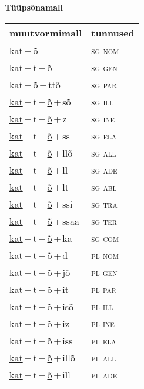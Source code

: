 
\vspace{1.8em}
\begin{minipage}{\textwidth}
\textbf{Tüüpsõnamall \,}\\

\begin{sideways}
\begin{tabular}{l l}
muutvormimall & tunnused \\
\hline
\underline{kat}\,+\,\underline{õ} & \textsc{ sg nom } \\
\underline{kat}\,+\,t\,+\,\underline{õ} & \textsc{ sg gen } \\
\underline{kat}\,+\,\underline{õ}\,+\,ttõ & \textsc{ sg par } \\
\underline{kat}\,+\,t\,+\,\underline{õ}\,+\,sõ & \textsc{ sg ill } \\
\underline{kat}\,+\,t\,+\,\underline{õ}\,+\,z & \textsc{ sg ine } \\
\underline{kat}\,+\,t\,+\,\underline{õ}\,+\,ss & \textsc{ sg ela } \\
\underline{kat}\,+\,t\,+\,\underline{õ}\,+\,llõ & \textsc{ sg all } \\
\underline{kat}\,+\,t\,+\,\underline{õ}\,+\,ll & \textsc{ sg ade } \\
\underline{kat}\,+\,t\,+\,\underline{õ}\,+\,lt & \textsc{ sg abl } \\
\underline{kat}\,+\,t\,+\,\underline{õ}\,+\,ssi & \textsc{ sg tra } \\
\underline{kat}\,+\,t\,+\,\underline{õ}\,+\,ssaa & \textsc{ sg ter } \\
\underline{kat}\,+\,t\,+\,\underline{õ}\,+\,ka & \textsc{ sg com } \\
\underline{kat}\,+\,t\,+\,\underline{õ}\,+\,d & \textsc{ pl nom } \\
\underline{kat}\,+\,t\,+\,\underline{õ}\,+\,jõ & \textsc{ pl gen } \\
\underline{kat}\,+\,t\,+\,\underline{õ}\,+\,it & \textsc{ pl par } \\
\underline{kat}\,+\,t\,+\,\underline{õ}\,+\,isõ & \textsc{ pl ill } \\
\underline{kat}\,+\,t\,+\,\underline{õ}\,+\,iz & \textsc{ pl ine } \\
\underline{kat}\,+\,t\,+\,\underline{õ}\,+\,iss & \textsc{ pl ela } \\
\underline{kat}\,+\,t\,+\,\underline{õ}\,+\,illõ & \textsc{ pl all } \\
\underline{kat}\,+\,t\,+\,\underline{õ}\,+\,ill & \textsc{ pl ade } \\

\end{tabular}
\end{sideways}
\end{minipage}
